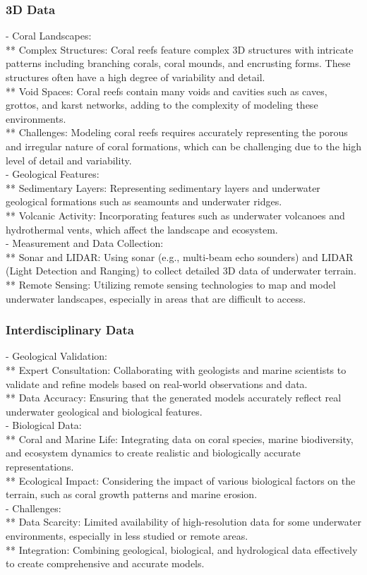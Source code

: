\subsubsection{3D Data}
- Coral Landscapes: \\
** Complex Structures: Coral reefs feature complex 3D structures with intricate patterns including branching corals, coral mounds, and encrusting forms. These structures often have a high degree of variability and detail. \\
** Void Spaces: Coral reefs contain many voids and cavities such as caves, grottos, and karst networks, adding to the complexity of modeling these environments. \\
** Challenges: Modeling coral reefs requires accurately representing the porous and irregular nature of coral formations, which can be challenging due to the high level of detail and variability. \\
- Geological Features: \\
** Sedimentary Layers: Representing sedimentary layers and underwater geological formations such as seamounts and underwater ridges. \\
** Volcanic Activity: Incorporating features such as underwater volcanoes and hydrothermal vents, which affect the landscape and ecosystem. \\
- Measurement and Data Collection: \\
** Sonar and LIDAR: Using sonar (e.g., multi-beam echo sounders) and LIDAR (Light Detection and Ranging) to collect detailed 3D data of underwater terrain. \\
** Remote Sensing: Utilizing remote sensing technologies to map and model underwater landscapes, especially in areas that are difficult to access.

\subsubsection{Interdisciplinary Data}
- Geological Validation: \\
** Expert Consultation: Collaborating with geologists and marine scientists to validate and refine models based on real-world observations and data. \\
** Data Accuracy: Ensuring that the generated models accurately reflect real underwater geological and biological features. \\
- Biological Data: \\
** Coral and Marine Life: Integrating data on coral species, marine biodiversity, and ecosystem dynamics to create realistic and biologically accurate representations. \\
** Ecological Impact: Considering the impact of various biological factors on the terrain, such as coral growth patterns and marine erosion. \\
- Challenges: \\
** Data Scarcity: Limited availability of high-resolution data for some underwater environments, especially in less studied or remote areas. \\
** Integration: Combining geological, biological, and hydrological data effectively to create comprehensive and accurate models. 

